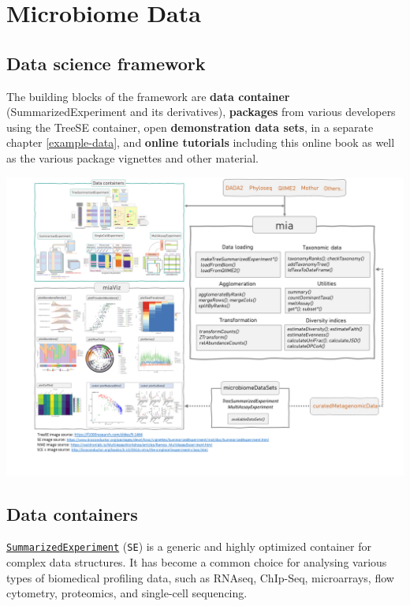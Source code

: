 \documentclass[
]{book}
\begin{document}
\hypertarget{containers}{%
\chapter{Microbiome Data}\label{containers}}

\hypertarget{data-science-framework}{%
\section{Data science framework}\label{data-science-framework}}

The building blocks of the framework are \textbf{data container}
(SummarizedExperiment and its derivatives), \textbf{packages} from various
developers using the TreeSE container, open \textbf{demonstration data
sets}, in a separate chapter \ref{example-data}, and \textbf{online
tutorials} including this online book as well as the various package
vignettes and other material.

\includegraphics[width=18.67in]{general/figures/FigureOverviewV2}

\hypertarget{data-containers}{%
\section{Data containers}\label{data-containers}}

\href{https://bioconductor.org/packages/release/bioc/html/SummarizedExperiment.html}{\texttt{SummarizedExperiment}}
(\texttt{SE}) is a generic and highly optimized container for complex data
structures. It has become a common choice for analysing various types
of biomedical profiling data, such as RNAseq, ChIp-Seq, microarrays,
flow cytometry, proteomics, and single-cell
sequencing.
\end{document}
